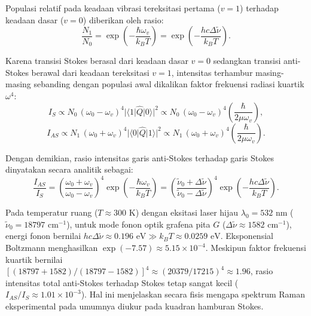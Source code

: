 Populasi relatif pada keadaan vibrasi tereksitasi pertama ($v=1$) terhadap keadaan dasar ($v=0$) diberikan oleh rasio:
\begin{equation}
\frac{N_1}{N_0} = \exp\left( - \frac{\hbar\omega_v}{k_B T} \right) = \exp\left( - \frac{h c \Delta\tilde{\nu}}{k_B T} \right).
\label{eq:rasio_populasi}
\end{equation}

Karena transisi Stokes berasal dari keadaan dasar $v=0$ sedangkan transisi anti-Stokes berawal dari keadaan tereksitasi $v=1$, intensitas terhambur masing-masing sebanding dengan populasi awal dikalikan faktor frekuensi radiasi kuartik $\omega^4$:
\begin{equation}
I_S \propto N_0 \, (\omega_0 - \omega_v)^4 |\langle 1 | \hat{Q} | 0 \rangle|^2 \propto N_0 \, (\omega_0 - \omega_v)^4 \left( \frac{\hbar}{2\mu\omega_v} \right),
\end{equation}
\begin{equation}
I_{AS} \propto N_1 \, (\omega_0 + \omega_v)^4 |\langle 0 | \hat{Q} | 1 \rangle|^2 \propto N_1 \, (\omega_0 + \omega_v)^4 \left( \frac{\hbar}{2\mu\omega_v} \right).
\end{equation}

Dengan demikian, rasio intensitas garis anti-Stokes terhadap garis Stokes dinyatakan secara analitik sebagai:
\begin{equation}
\frac{I_{AS}}{I_S} = \left( \frac{\omega_0 + \omega_v}{\omega_0 - \omega_v} \right)^4 \exp\left( - \frac{\hbar\omega_v}{k_B T} \right) = \left( \frac{\tilde{\nu}_0 + \Delta\tilde{\nu}}{\tilde{\nu}_0 - \Delta\tilde{\nu}} \right)^4 \exp\left( - \frac{h c \Delta\tilde{\nu}}{k_B T} \right).
\label{eq:rasio_as_s}
\end{equation}

Pada temperatur ruang ($T \approx 300\text{ K}$) dengan eksitasi laser hijau $\lambda_0 = 532\text{ nm}$ ($\tilde{\nu}_0 = 18797\text{ cm}^{-1}$), untuk mode fonon optik grafena pita $G$ ($\Delta\tilde{\nu} \approx 1582\text{ cm}^{-1}$), energi fonon bernilai $h c \Delta\tilde{\nu} \approx 0.196\text{ eV} \gg k_B T \approx 0.0259\text{ eV}$. Eksponensial Boltzmann menghasilkan $\exp(-7.57) \approx 5.15 \times 10^{-4}$. Meskipun faktor frekuensi kuartik bernilai $[(18797 + 1582)/(18797 - 1582)]^4 \approx (20379 / 17215)^4 \approx 1.96$, rasio intensitas total anti-Stokes terhadap Stokes tetap sangat kecil ($I_{AS}/I_S \approx 1.01 \times 10^{-3}$). Hal ini menjelaskan secara fisis mengapa spektrum Raman eksperimental pada umumnya diukur pada kuadran hamburan Stokes.
